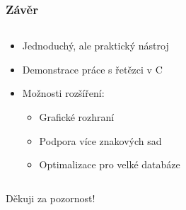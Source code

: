 \documentclass{beamer}
\begin{document}
\begin{frame}
\frametitle{Závěr}
\begin{columns}
\begin{column}{0.7\textwidth}
\begin{itemize}
\item Jednoduchý, ale praktický nástroj
\item Demonstrace práce s řetězci v C
\item Možnosti rozšíření:
\begin{itemize}
\item Grafické rozhraní
\item Podpora více znakových sad
\item Optimalizace pro velké databáze
\end{itemize}
\end{itemize}
\end{column}
\begin{column}{0.3\textwidth}
\end{column}
\end{columns}

\vspace{0.5cm}
\centering
\Large{Děkuji za pozornost!}
\end{frame}
\end{document}
